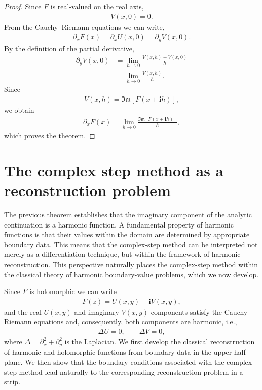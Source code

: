 \documentclass[11pt]{article}
\newcommand{\imag}{\textbf{i}}
\newcommand{\ImagPart}{\mathfrak{Im}}
\begin{document}
	\begin{proof}
	Since \(F\) is real-valued on the real axis,
%
\begin{align*}
	V(x,0)=0.
\end{align*}
%
From the Cauchy--Riemann equations we can write,
%
\begin{align*}
	\partial_x F(x)
	=
	\partial_x U(x,0)
	=
	\partial_y V(x,0).
\end{align*}
%
By the definition of the partial derivative,
%
\begin{align*}
	\partial_y V(x,0)
	&=
	\lim_{h\rightarrow0}
	\frac{V(x,h)-V(x,0)}{h} \\
	&=
	\lim_{h\rightarrow0}
	\frac{V(x,h)}{h}.
\end{align*}
%
Since
%
\begin{align*}
	V(x,h)=\ImagPart\!\left[F(x+\imag h)\right],
\end{align*}
%
we obtain
%
\begin{align*}
	\partial_x F(x)
	=
	\lim_{h\rightarrow0}
	\frac{\ImagPart\!\left[F(x+\imag h)\right]}{h},
\end{align*}
%
which proves the theorem.
	\end{proof}


\section{The complex step method as a reconstruction problem}

The previous theorem establishes that the imaginary component of the
analytic continuation is a harmonic function. A fundamental property
of harmonic functions is that their values within the domain are
determined by appropriate boundary data. This means that the complex-step
method can be interpreted not merely as a differentiation technique,
but within the framework of harmonic reconstruction. This perspective
naturally places the complex-step method within the classical theory of
harmonic boundary-value problems, which we now develop.

Since \(F\) is holomorphic we can write
%
\begin{align*}
	F(z) = U(x,y) + \imag V(x,y),
\end{align*}
%
and the real \(U(x,y)\) and imaginary \(V(x,y)\) components satisfy the
Cauchy--Riemann equations and, consequently, both components are
harmonic, i.e.,
%
\begin{align*}
	\Delta U = 0, \qquad \Delta V = 0,
\end{align*}
%
where \(\Delta=\partial_x^2+\partial_y^2\) is the Laplacian. We first develop the classical reconstruction of harmonic and holomorphic functions from boundary data in the upper half-plane. We then show that the boundary conditions associated with the complex-step method lead naturally to the corresponding reconstruction problem in a strip.
	
\end{document}
